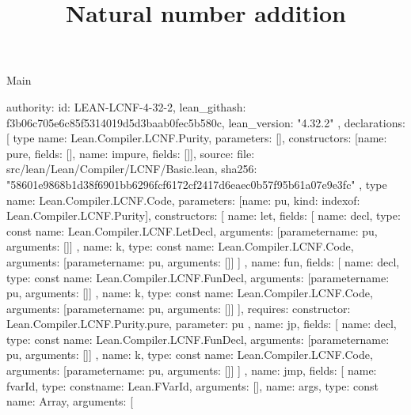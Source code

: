 \begin{lexlean}{Main}
\title{Natural number addition}
\begin{toolingmodule}
{
  authority: {
    id: LEAN-LCNF-4-32-2,
    lean_githash: f3b06c705e6c85f5314019d5d3baab0fec5b580c,
    lean_version: "4.32.2"
  },
  declarations: [
    type{
      name: Lean.Compiler.LCNF.Purity,
      parameters: [],
      constructors: [{name: pure, fields: []}, {name: impure, fields: []}],
      source: {
        file: src/lean/Lean/Compiler/LCNF/Basic.lean,
        sha256: "58601e9868b1d38f6901bb6296fcf6172cf2417d6eaec0b57f95b61a07e9e3fc"
      }
    },
    type{
      name: Lean.Compiler.LCNF.Code,
      parameters: [{name: pu, kind: index{of: Lean.Compiler.LCNF.Purity}}],
      constructors: [
        {
          name: let,
          fields: [
            {
              name: decl,
              type: const{
                name: Lean.Compiler.LCNF.LetDecl,
                arguments: [parameter{name: pu, arguments: []}]
              }
            },
            {
              name: k,
              type: const{
                name: Lean.Compiler.LCNF.Code,
                arguments: [parameter{name: pu, arguments: []}]
              }
            }
          ]
        },
        {
          name: fun,
          fields: [
            {
              name: decl,
              type: const{
                name: Lean.Compiler.LCNF.FunDecl,
                arguments: [parameter{name: pu, arguments: []}]
              }
            },
            {
              name: k,
              type: const{
                name: Lean.Compiler.LCNF.Code,
                arguments: [parameter{name: pu, arguments: []}]
              }
            }
          ],
          requires: {constructor: Lean.Compiler.LCNF.Purity.pure, parameter: pu}
        },
        {
          name: jp,
          fields: [
            {
              name: decl,
              type: const{
                name: Lean.Compiler.LCNF.FunDecl,
                arguments: [parameter{name: pu, arguments: []}]
              }
            },
            {
              name: k,
              type: const{
                name: Lean.Compiler.LCNF.Code,
                arguments: [parameter{name: pu, arguments: []}]
              }
            }
          ]
        },
        {
          name: jmp,
          fields: [
            {name: fvarId, type: const{name: Lean.FVarId, arguments: []}},
            {
              name: args,
              type: const{
                name: Array,
                arguments: [
}}}}}
\end{toolingmodule}
\end{lexlean}
